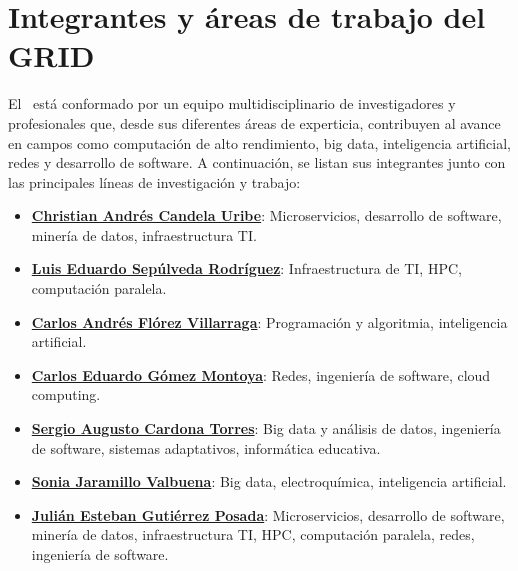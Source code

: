 

\section{Integrantes y áreas de trabajo del GRID}

El \GRID\ está conformado por un equipo multidisciplinario de investigadores y profesionales que, desde sus diferentes áreas de experticia, contribuyen al avance en campos como computación de alto rendimiento, big data, inteligencia artificial, redes y desarrollo de software. A continuación, se listan sus integrantes junto con las principales líneas de investigación y trabajo:  

\begin{itemize}
  \item \href{https://scienti.minciencias.gov.co/cvlac/visualizador/generarCurriculoCv.do?cod_rh=0000210897}{\textbf{Christian Andrés Candela Uribe}}: Microservicios, desarrollo de software, minería de datos, infraestructura TI.
  \item \href{https://scienti.minciencias.gov.co/cvlac/visualizador/generarCurriculoCv.do?cod_rh=0001383939}{\textbf{Luis Eduardo Sepúlveda Rodríguez}}: Infraestructura de TI, HPC, computación paralela.
  \item \href{https://scienti.minciencias.gov.co/cvlac/visualizador/generarCurriculoCv.do?cod_rh=0001638854}{\textbf{Carlos Andrés Flórez Villarraga}}: Programación y algoritmia, inteligencia artificial.
  \item \href{https://scienti.minciencias.gov.co/cvlac/visualizador/generarCurriculoCv.do?cod_rh=0001343801}{\textbf{Carlos Eduardo Gómez Montoya}}: Redes, ingeniería de software, cloud computing.
  \item \href{https://scienti.minciencias.gov.co/cvlac/visualizador/generarCurriculoCv.do?cod_rh=0001398775}{\textbf{Sergio Augusto Cardona Torres}}: Big data y análisis de datos, ingeniería de software, sistemas adaptativos, informática educativa.
  \item \href{https://scienti.minciencias.gov.co/cvlac/visualizador/generarCurriculoCv.do?cod_rh=0000193550}{\textbf{Sonia Jaramillo Valbuena}}: Big data, electroquímica, inteligencia artificial.
  \item \href{https://scienti.minciencias.gov.co/cvlac/visualizador/generarCurriculoCv.do?cod_rh=0000283495}{\textbf{Julián Esteban Gutiérrez Posada}}: Microservicios, desarrollo de software, minería de datos, infraestructura TI, HPC, computación paralela, redes, ingeniería de software.
\end{itemize}

